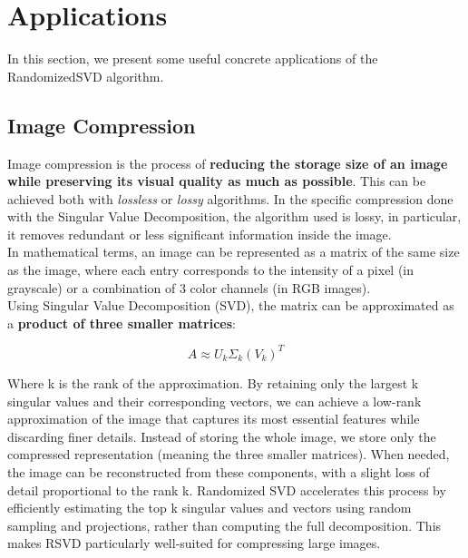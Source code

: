 \documentclass[11pt,a4paper]{article}
\begin{document}
\section{Applications}
In this section, we present some useful concrete applications of the RandomizedSVD algorithm.
\subsection{Image Compression}
Image compression is the process of \textbf{reducing the storage size of an image while preserving its visual quality as much as possible}. This can be achieved both with \textit{lossless} or \textit{lossy} algorithms. In the specific compression done with the Singular Value Decomposition, the algorithm used is lossy, in particular, it removes redundant or less significant information inside the image.\\ In mathematical terms, an image can be represented as a matrix of the same size as the image, where each entry corresponds to the intensity of a pixel (in grayscale) or a combination of 3 color channels (in RGB images).\\ 
Using Singular Value Decomposition (SVD), the matrix can be approximated as a \textbf{product of three smaller matrices}: 

\[A \approx U_k \Sigma_k (V_k)^T\]

Where k is the rank of the approximation. By retaining only the largest k singular values and their corresponding vectors, we can achieve a low-rank approximation of the image that captures its most essential features while discarding finer details. Instead of storing the whole image, we store only the compressed representation (meaning the three smaller matrices). When needed, the image can be reconstructed from these components, with a slight loss of detail proportional to the rank k. Randomized SVD accelerates this process by efficiently estimating the top k singular values and vectors using random sampling and projections, rather than computing the full decomposition. This makes RSVD particularly well-suited for compressing large images. 
\end{document}
